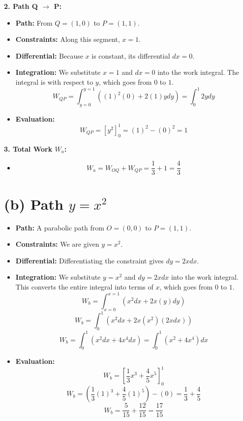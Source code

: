 \documentclass[11pt, a4paper]{article} %
\begin{document}
\textbf{2. Path Q $\to$ P:}
\begin{itemize}
    \item \textbf{Path:} From $Q=(1,0)$ to $P=(1,1)$.
    \item \textbf{Constraints:} Along this segment, $x=1$.
    \item \textbf{Differential:} Because $x$ is constant, its differential $dx = 0$.
    \item \textbf{Integration:} We substitute $x=1$ and $dx=0$ into the work integral. The integral is with respect to $y$, which goes from $0$ to $1$.
    $$W_{QP} = \int_{y=0}^{y=1} ((1)^2(0) + 2(1)y dy) = \int_0^1 2y dy$$
    \item \textbf{Evaluation:}
    $$W_{QP} = \left[ y^2 \right]_0^1 = (1)^2 - (0)^2 = 1$$
\end{itemize}

\textbf{3. Total Work $W_a$:}
\begin{itemize}
    \item $$W_a = W_{OQ} + W_{QP} = \frac{1}{3} + 1 = \frac{4}{3}$$
\end{itemize}

\hrulefill

\section*{(b) Path $y = x^2$}

\begin{itemize}
    \item \textbf{Path:} A parabolic path from $O=(0,0)$ to $P=(1,1)$.
    \item \textbf{Constraints:} We are given $y = x^2$.
    \item \textbf{Differential:} Differentiating the constraint gives $dy = 2x dx$.
    \item \textbf{Integration:} We substitute $y=x^2$ and $dy=2x dx$ into the work integral. This converts the entire integral into terms of $x$, which goes from $0$ to $1$.
    $$W_b = \int_{x=0}^{x=1} (x^2 dx + 2x(y) dy)$$
    $$W_b = \int_0^1 \left( x^2 dx + 2x(x^2) (2x dx) \right)$$
    $$W_b = \int_0^1 \left( x^2 dx + 4x^4 dx \right) = \int_0^1 (x^2 + 4x^4) dx$$
    \item \textbf{Evaluation:}
    $$W_b = \left[ \frac{1}{3}x^3 + \frac{4}{5}x^5 \right]_0^1$$
    $$W_b = \left( \frac{1}{3}(1)^3 + \frac{4}{5}(1)^5 \right) - (0) = \frac{1}{3} + \frac{4}{5}$$
    $$W_b = \frac{5}{15} + \frac{12}{15} = \frac{17}{15}$$
\end{itemize}
\end{document}
